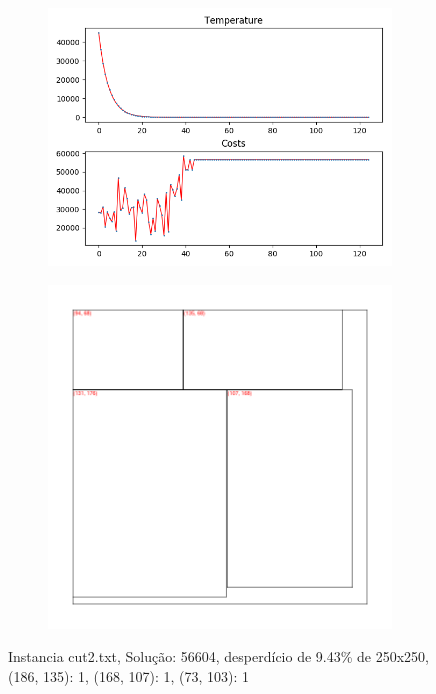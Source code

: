 \begin{figure}
\centering
\begin{subfigure}{.5\textwidth}
  \centering
  \includegraphics[width=1\linewidth]{results/cut2/2/plot}
  \label{fig:sub1}
\end{subfigure}%
\begin{subfigure}{.5\textwidth}
  \centering
  \includegraphics[width=1\linewidth]{results/cut2/2/cut}
  \label{fig:sub2}
\end{subfigure}
\caption{Instancia cut2.txt, Solução: 56604, desperdício de 9.43\% de 250x250, {(186, 135): 1, (168, 107): 1, (73, 103): 1}}
\label{fig:test}
\end{figure}


